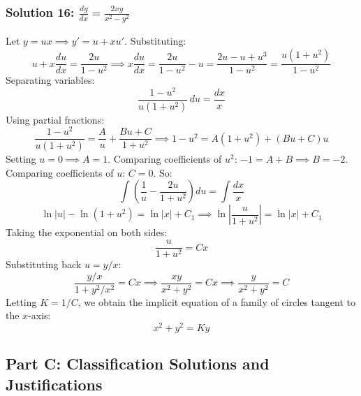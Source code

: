\documentclass[11pt,letterpaper]{article}
\begin{document}
\subsubsection*{Solution 16: $\frac{dy}{dx} = \frac{2xy}{x^2 - y^2}$}
Let $y = ux \implies y' = u + x u'$. Substituting:
\[ u + x\frac{du}{dx} = \frac{2u}{1-u^2} \implies x\frac{du}{dx} = \frac{2u}{1-u^2} - u = \frac{2u - u + u^3}{1-u^2} = \frac{u(1+u^2)}{1-u^2} \]
Separating variables:
\[ \frac{1-u^2}{u(1+u^2)} \, du = \frac{dx}{x} \]
Using partial fractions:
\[ \frac{1-u^2}{u(1+u^2)} = \frac{A}{u} + \frac{Bu+C}{1+u^2} \implies 1-u^2 = A(1+u^2) + (Bu+C)u \]
Setting $u = 0 \implies A = 1$.
Comparing coefficients of $u^2$: $-1 = A+B \implies B = -2$.
Comparing coefficients of $u$: $C = 0$.
So:
\[ \int \left( \frac{1}{u} - \frac{2u}{1+u^2} \right) du = \int \frac{dx}{x} \]
\[ \ln|u| - \ln(1+u^2) = \ln|x| + C_1 \implies \ln\left| \frac{u}{1+u^2} \right| = \ln|x| + C_1 \]
Taking the exponential on both sides:
\[ \frac{u}{1+u^2} = C x \]
Substituting back $u = y/x$:
\[ \frac{y/x}{1 + y^2/x^2} = C x \implies \frac{xy}{x^2+y^2} = C x \implies \frac{y}{x^2+y^2} = C \]
Letting $K = 1/C$, we obtain the implicit equation of a family of circles tangent to the $x$-axis:
\[ x^2 + y^2 = K y \]

\subsection*{Part C: Classification Solutions and Justifications}
\end{document}
